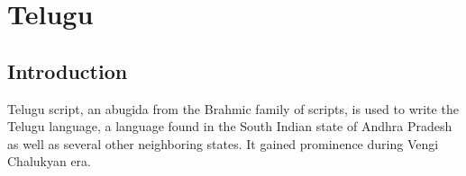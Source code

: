\chapter{Telugu}
\section{Introduction}

Telugu script, an abugida from the Brahmic family of scripts, is used to write the Telugu language, a language found in the South Indian state of Andhra Pradesh as well as several other neighboring states. It gained prominence during Vengi Chalukyan era. 
